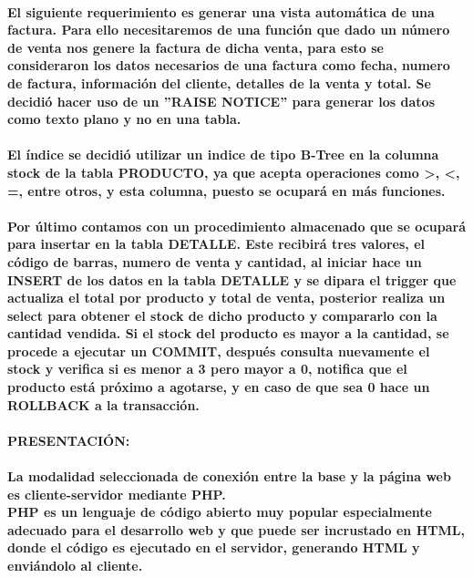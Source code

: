 \documentclass{article}
\begin{document}
	 \paragraph{El siguiente requerimiento es generar una vista automática de una factura. Para ello necesitaremos de una función que dado un número de venta nos genere la factura de dicha venta, para esto se consideraron los datos necesarios de una factura como fecha, numero de factura, información del cliente, detalles de la venta y total. Se decidió hacer uso de un ''RAISE NOTICE'' para generar los datos como texto plano y no en una tabla.}
	 
	 \paragraph{El índice se decidió utilizar un indice de tipo B-Tree en la columna stock de la tabla PRODUCTO, ya que acepta operaciones como >, <, =, entre otros, y esta columna, puesto se ocupará en más funciones.}
	 
	 \paragraph{Por último contamos con un procedimiento almacenado que se ocupará para insertar en la tabla DETALLE. Este recibirá tres valores, el código de barras, numero de venta y cantidad, al iniciar hace un INSERT de los datos en la tabla DETALLE y se dipara el trigger que actualiza el total por producto y total de venta, posterior realiza un select para obtener el stock de dicho producto y compararlo con la cantidad vendida. Si el stock del producto es mayor a la cantidad, se procede a ejecutar un COMMIT, después consulta nuevamente el stock y verifica si es menor a 3 pero mayor a 0, notifica que el producto está próximo a agotarse, y en caso de que sea 0 hace un ROLLBACK a la transacción.}

    \paragraph{PRESENTACIÓN:}
    \paragraph{La modalidad seleccionada de conexión entre la base y la página web es cliente-servidor mediante PHP. 
    \\PHP es un lenguaje de código abierto muy popular especialmente adecuado para el desarrollo web y que puede ser incrustado en  HTML, donde el código es ejecutado en el servidor, generando HTML y enviándolo al cliente. }
\end{document}
